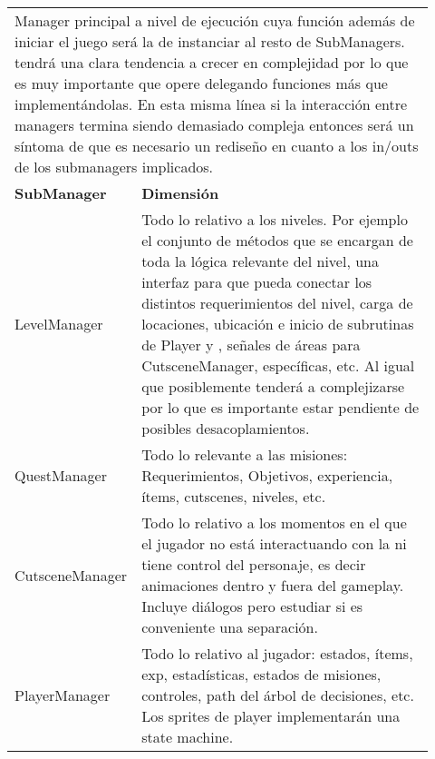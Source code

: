 \pagebreak[4]
\begin{center}
	\color{colortableborder}
	\setlength{\arrayrulewidth}{1pt} 
	\begin{longtable}{|p{0.2\linewidth}|p{0.725\linewidth}|}
		\hline
		\endhead
		\rowcolor{colorthbg}\multicolumn{2}{|l|}{\color{colorthtext}\textbf{GameManager}} \\
		\hline
		\multicolumn{2}{|p{0.961\linewidth}|}{\color{colortextotabla}Manager principal a nivel de ejecución cuya función además de iniciar el juego será la de instanciar al resto de SubManagers. \lsc{GM} tendrá una clara tendencia a crecer en complejidad por lo que es muy importante que opere delegando funciones más que implementándolas. En esta misma línea si la interacción entre managers termina siendo demasiado compleja entonces será un síntoma de que es necesario un rediseño en cuanto a los in/outs de los submanagers implicados.} \\
		\hline
		\rowcolor{colorthbg}\color{colorthtext}\textbf{SubManager} & \color{colorthtext}\textbf{Dimensión} \\
		\hline
		\color{colorthalt}LevelManager & \color{colortextotabla}Todo lo relativo a los niveles. Por ejemplo el conjunto de métodos que se encargan de toda la lógica relevante del nivel, una interfaz para que \lsc{GM} pueda conectar los distintos requerimientos del nivel, carga de locaciones, ubicación e inicio de subrutinas de Player y \lsc{NPC}, señales de áreas para CutsceneManager, \lsc{UI} específicas, etc. 
		Al igual que \lsc{GM} posiblemente tenderá a complejizarse por lo que es importante estar pendiente de posibles desacoplamientos. \\
		\hline
		\color{colorthalt}QuestManager & \color{colortextotabla}Todo lo relevante a las misiones: Requerimientos, Objetivos, experiencia, ítems, cutscenes, niveles, etc. \\
		\hline
		\color{colorthalt}Cutscene\newline{}Manager & \color{colortextotabla}Todo lo relativo a los momentos en el que el jugador no está interactuando con la \lsc{UI} ni tiene control del personaje, es decir animaciones dentro y fuera del gameplay. Incluye diálogos pero estudiar si es conveniente una separación. \\
		\hline
		\color{colorthalt}PlayerManager & \color{colortextotabla}Todo lo relativo al jugador: estados, ítems, exp, estadísticas, estados de misiones, controles, path del árbol de decisiones, etc. Los sprites de player implementarán una state machine.\\

\end{longtable}
\end{center}
